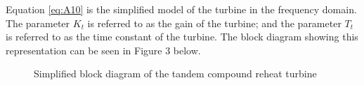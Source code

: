 Equation \ref{eq:A10} is the simplified model of the turbine in the frequency domain. The parameter $K_t$ is referred to as the gain of the turbine; and the parameter $T_t$ is referred to as the time constant of the turbine. The block diagram showing this representation can be seen in Figure 3 below.   

\begin{figure}[h]
	\centering
	
	\caption{Simplified block diagram of the tandem compound reheat turbine}
	\label{fig:A05_turbine_model}
\end{figure}